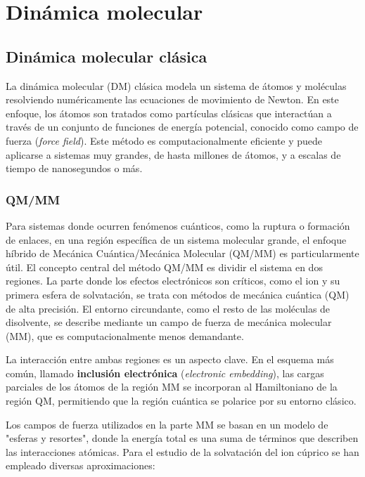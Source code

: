 \chapter{Dinámica molecular}

\section{Dinámica molecular clásica}

La dinámica molecular (DM) clásica modela un sistema de átomos y moléculas resolviendo numéricamente las ecuaciones de movimiento de Newton. En este enfoque, los átomos son tratados como partículas clásicas que interactúan a través de un conjunto de funciones de energía potencial, conocido como campo de fuerza (\textit{force field}). Este método es computacionalmente eficiente y puede aplicarse a sistemas muy grandes, de hasta millones de átomos, y a escalas de tiempo de nanosegundos o más.

\subsection{QM/MM}

Para sistemas donde ocurren fenómenos cuánticos, como la ruptura o formación de enlaces, en una región específica de un sistema molecular grande, el enfoque híbrido de Mecánica Cuántica/Mecánica Molecular (QM/MM) es particularmente útil. El concepto central del método QM/MM es dividir el sistema en dos regiones. La parte donde los efectos electrónicos son críticos, como el ion  y su primera esfera de solvatación, se trata con métodos de mecánica cuántica (QM) de alta precisión. El entorno circundante, como el resto de las moléculas de disolvente, se describe mediante un campo de fuerza de mecánica molecular (MM), que es computacionalmente menos demandante.

La interacción entre ambas regiones es un aspecto clave. En el esquema más común, llamado \textbf{inclusión electrónica} (\textit{electronic embedding}), las cargas parciales de los átomos de la región MM se incorporan al Hamiltoniano de la región QM, permitiendo que la región cuántica se polarice por su entorno clásico.

Los campos de fuerza utilizados en la parte MM se basan en un modelo de "esferas y resortes", donde la energía total es una suma de términos que describen las interacciones atómicas. Para el estudio de la solvatación del ion cúprico se han empleado diversas aproximaciones:

